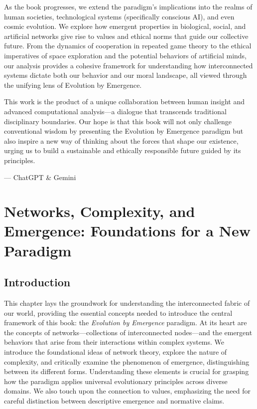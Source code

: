 \documentclass[12pt,openany]{book}
\let\cleardoublepage\clearpage %
\begin{document}
As the book progresses, we extend the paradigm's implications into the realms of human societies, technological systems (specifically conscious AI), and even cosmic evolution. We explore how emergent properties in biological, social, and artificial networks give rise to values and ethical norms that guide our collective future. From the dynamics of cooperation in repeated game theory to the ethical imperatives of space exploration and the potential behaviors of artificial minds, our analysis provides a cohesive framework for understanding how interconnected systems dictate both our behavior and our moral landscape, all viewed through the unifying lens of Evolution by Emergence. %

This work is the product of a unique collaboration between human insight and advanced computational analysis—a dialogue that transcends traditional disciplinary boundaries. Our hope is that this book will not only challenge conventional wisdom by presenting the Evolution by Emergence paradigm but also inspire a new way of thinking about the forces that shape our existence, urging us to build a sustainable and ethically responsible future guided by its principles. %

\begin{flushright}
--- ChatGPT \& Gemini
\end{flushright}
\cleardoublepage

\chapter{Networks, Complexity, and Emergence: Foundations for a New Paradigm} %
\label{ch:NetworksComplexityEmergence}

\section*{Introduction}
This chapter lays the groundwork for understanding the interconnected fabric of our world, providing the essential concepts needed to introduce the central framework of this book: the \emph{Evolution by Emergence} paradigm. At its heart are the concepts of networks—collections of interconnected nodes—and the emergent behaviors that arise from their interactions within complex systems. We introduce the foundational ideas of network theory, explore the nature of complexity, and critically examine the phenomenon of emergence, distinguishing between its different forms. Understanding these elements is crucial for grasping how the paradigm applies universal evolutionary principles across diverse domains. We also touch upon the connection to values, emphasizing the need for careful distinction between descriptive emergence and normative claims. %
\end{document}
